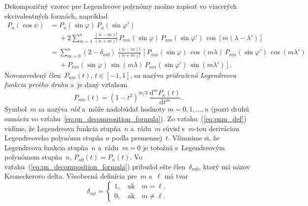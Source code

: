 \documentclass[a4paper, 12pt]{book}
\newcommand{\diff}{\mathrm d}
\begin{document}
Dekompozičný vzorec pre Legendreove polynómy možno zapísať vo viacerých
ekvivalentných formách, napríklad
\parencite{Hobson,MoritzPhysicalGeodesy,SansoGeoidDetermination}
%
\begin{equation}
\label{eq:pn_decomposition_formula}
\begin{split}
P_n(\cos\psi) &= P_n(\sin\varphi) \, P_n(\sin\varphi')\\
%
&\phantom{={}} +2 \sum_{m = 1}^{n} \frac{(n - m)!}{(n + m)!} \,
P_{nm}(\sin\varphi) \, P_{nm}(\sin\varphi') \, \cos\left[m (\lambda
- \lambda') \right]\\
%
&= \sum_{m = 0}^{n} (2 - \delta_{m0}) \, \frac{(n - m)!}{(n + m)!} \, \left[
P_{nm}(\sin\varphi) \, \cos(m\lambda) \, P_{nm}(\sin\varphi') \,
\cos(m\lambda')\right.\\
%
&\phantom{={}}+\left. P_{nm}(\sin\varphi) \, \sin(m\lambda) \,
P_{nm}(\sin\varphi') \, \sin(m\lambda')\right]{.}
\end{split}
\end{equation}
%
Novozavedený člen~$P_{nm}(t)$, $t \in [-1, 1]$, sa nazýva \emph{pridružená 
Legendreova funkcia prvého druhu}
a~je daný vzťahom
%
\begin{equation}
\label{eq:pnm_def}
P_{nm}(t) = (1 - t^2)^{m \slash 2} \, \frac{\diff^m P_n(t)}{\diff t^m}{.}
\end{equation}
%
Symbol~$m$ sa nazýva \emph{rád} a~môže nadobúdať hodnoty $m = 0, 1, \dots, n$ 
(pozri druhú sumáciu vo vzťahu~\ref{eq:pn_decomposition_formula}).  Zo 
vzťahu~(\ref{eq:pnm_def}) vidíme, že Legendreova funkcia stupňa~$n$ a~rádu~$m$ 
súvisí s~$m$-tou deriváciou Legendreoveho polynómu stupňa $n$ podľa 
premennej~$t$.  Všimnime si, že Legendreova funkcia stupňa~$n$ a~rádu~$m = 0$ 
je totožná s~Legendreovým polynómom stupňa~$n$, $P_{n0}(t) = P_n(t)$.   Vo 
vzťahu~(\ref{eq:pn_decomposition_formula}) pribudol ešte člen~$\delta_{m0}$, 
ktorý má názov Kroneckerovo delta.  Všeobecná definícia pre~$m$ a~$\ell$ má 
tvar
%
\begin{equation}
\delta_{ml} =
%
\begin{cases}
1{,} \quad \mathrm{ak} \quad m = \ell{,}\\
0{,} \quad \mathrm{ak} \quad m \neq \ell{.}
\end{cases}
\end{equation}
\end{document}

